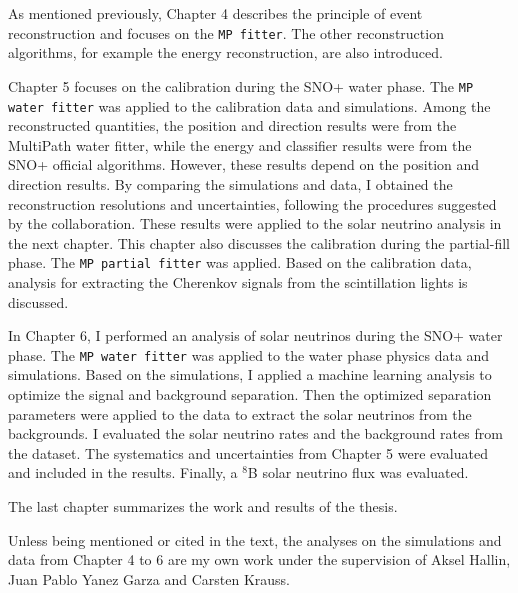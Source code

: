As mentioned previously, Chapter 4 describes the principle of event reconstruction and focuses on the \texttt{MP fitter}. The other reconstruction algorithms, for example the energy reconstruction, are also introduced. 

Chapter 5 focuses on the calibration during the SNO+ water phase. The \texttt{MP water fitter} was applied to the calibration data and simulations. Among the reconstructed quantities, the position and direction results were from the MultiPath water fitter, while the energy and classifier results were from the SNO+ official algorithms. However, these results depend on the position and direction results. By comparing the simulations and data, I obtained the reconstruction resolutions and uncertainties, following the procedures suggested by the collaboration. These results were applied to the solar neutrino analysis in the next chapter. This chapter also discusses the calibration during the partial-fill phase. The \texttt{MP partial fitter} was applied. Based on the calibration data, analysis for extracting the Cherenkov signals from the scintillation lights is discussed.

In Chapter 6, I performed an analysis of solar neutrinos during the SNO+ water phase. The \texttt{MP water fitter} was applied to the water phase physics data and simulations. Based on the simulations, I applied a machine learning analysis to optimize the signal and background separation. Then the optimized separation parameters were applied to the data to extract the solar neutrinos from the backgrounds. I evaluated the solar neutrino rates and the background rates from the dataset. The systematics and uncertainties from Chapter 5 were evaluated and included in the results. Finally, a $^8$B solar neutrino flux was evaluated.

The last chapter summarizes the work and results of the thesis. 

Unless being mentioned or cited in the text, the analyses on the simulations and data from Chapter 4 to 6 are my own work under the supervision of Aksel Hallin, Juan Pablo Yanez Garza and Carsten Krauss.
